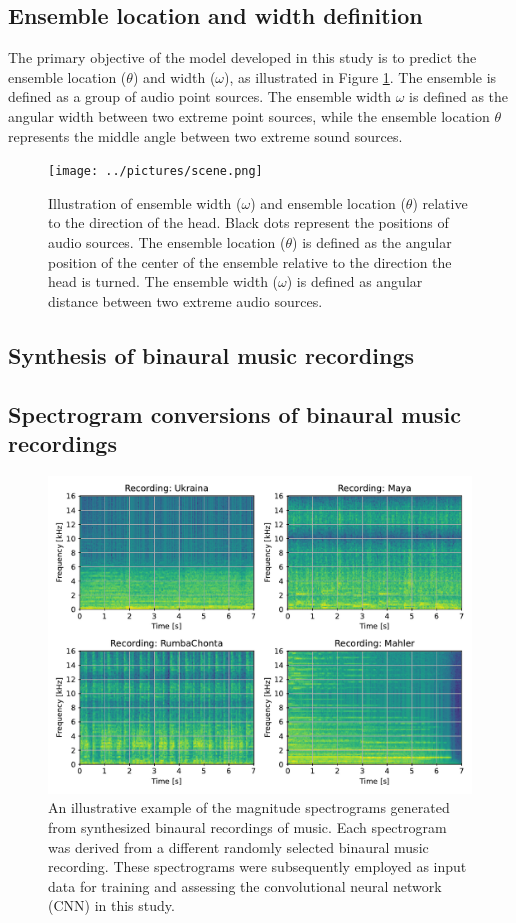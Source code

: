 \documentclass{article}
\begin{document}
\subsection{Ensemble location and width definition}
\label{subsec:ensemble-definition}

The primary objective of the model developed in this study is to predict the ensemble location ($\theta$) and width ($\omega$), as illustrated in Figure \ref{fig:scene}. The ensemble is defined as a group of audio point sources. The ensemble width $\omega$ is defined as the angular width between two extreme point sources, while the ensemble location $\theta$ represents the middle angle between two extreme sound sources.

\begin{figure}
\centering
\texttt{[image: ../pictures/scene.png]}
\caption{\label{fig:scene}Illustration of ensemble width ($\omega$) and ensemble location ($\theta$) relative to the direction of the head. Black dots represent the positions of audio sources. The ensemble location ($\theta$) is defined as the angular position of the center of the ensemble relative to the direction the head is turned. The ensemble width ($\omega$) is defined as angular distance between two extreme audio sources. }
\end{figure}

\subsection{Synthesis of binaural music recordings}
\subsection{Spectrogram conversions of binaural music recordings}

\begin{figure}
\centering
\includegraphics[width=\linewidth]{../figures/samples.pdf}
\caption{\label{fig:samples}An illustrative example of the magnitude spectrograms generated from synthesized binaural recordings of music. Each spectrogram was derived from a different randomly selected binaural music recording. These spectrograms were subsequently employed as input data for training and assessing the convolutional neural network (CNN) in this study. }
\end{figure}
\end{document}
